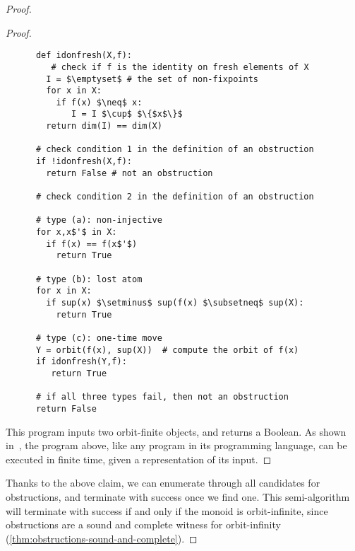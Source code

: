 \begin{proof}
\begin{proof}
\begin{lstlisting}
      def idonfresh(X,f):
         # check if f is the identity on fresh elements of X 
        I = $\emptyset$ # the set of non-fixpoints
        for x in X:
          if f(x) $\neq$ x:
             I = I $\cup$ $\{$x$\}$
        return dim(I) == dim(X)

      # check condition 1 in the definition of an obstruction 
      if !idonfresh(X,f):
        return False # not an obstruction

      # check condition 2 in the definition of an obstruction

      # type (a): non-injective
      for x,x$'$ in X: 
        if f(x) == f(x$'$) 
          return True 
    
      # type (b): lost atom
      for x in X:
        if sup(x) $\setminus$ sup(f(x) $\subsetneq$ sup(X):
          return True 

      # type (c): one-time move
      Y = orbit(f(x), sup(X))  # compute the orbit of f(x)
      if idonfresh(Y,f):
         return True

      # if all three types fail, then not an obstruction
      return False
        \end{lstlisting}
    This program inputs two orbit-finite objects, and returns a Boolean.
    As shown in~\cite[Theorem 11.2]{bojanczyk_slightly2018}, the program above, like any program in its programming language, can be executed in finite time, given a representation of its input. 		
    \end{proof}

    Thanks to the above claim, we can enumerate through all candidates for obstructions, and terminate with success once we find one. This semi-algorithm will terminate with success if and only if the monoid is orbit-infinite, since obstructions are a sound and complete witness for orbit-infinity (\cref{thm:obstructions-sound-and-complete}).
\end{proof}


